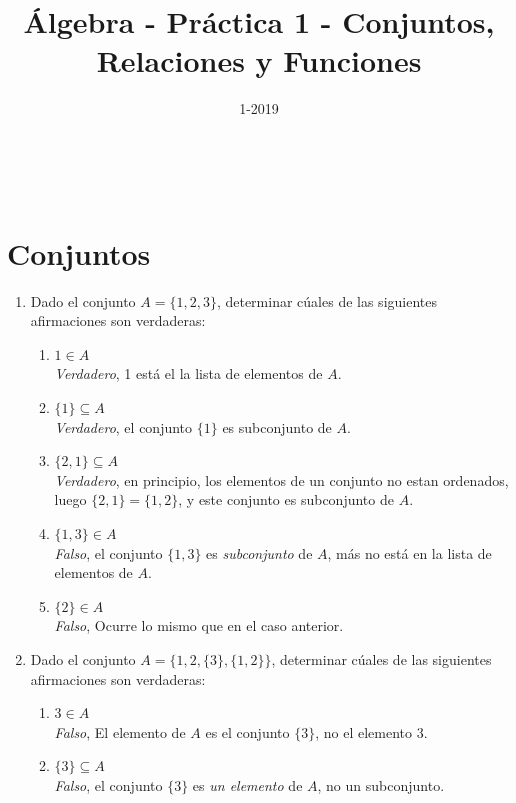 \documentclass[a4paper,11pt]{article}
\title{Álgebra - Pr\'actica 1 - Conjuntos, Relaciones y Funciones}
\author{}
\date{1-2019}
\makeatletter
\renewcommand{\maketitle}{
\begin{center}
\begin{normalsize}\textbf{\@title}\end{normalsize}\\
\begin{normalsize}\@author\end{normalsize}
\end{center}
}
\makeatother
\begin{document}
\maketitle
\section*{Conjuntos}
    \begin{enumerate}
        \item Dado el conjunto $A=\{1,2,3\}$, determinar c\'uales de las siguientes afirmaciones son verdaderas:
        \begin{enumerate}[label = \roman*)]
            \item $1\in A$\\
                \colorbox{g}{\textit{Verdadero}}, 1 est\'a el la lista de elementos de $A$.
            \item $\{1\}\subseteq A$\\
                \colorbox{g}{\textit{Verdadero}}, el conjunto $\{1\}$ es subconjunto de $A$.
            \item $\{2,1\}\subseteq A$\\
                \colorbox{g}{\textit{Verdadero}}, en principio, los elementos de un conjunto no estan ordenados, luego $\{2,1\}=\{1,2\}$, y este conjunto es subconjunto de $A$.
            \item $\{1,3\}\in A$\\
                \colorbox{g}{\textit{Falso}}, el conjunto $\{1,3\}$ es \textit{subconjunto} de $A$, m\'as no est\'a en la lista de elementos de $A$.
            \item $\{2\}\in A$\\
                \colorbox{g}{\textit{Falso}}, Ocurre lo mismo que en el caso anterior.
        \end{enumerate}
        \item Dado el conjunto $A = \{1,2,\{3\},\{1,2\}\} $, determinar c\'uales de las siguientes afirmaciones son verdaderas:
        \begin{enumerate}[label = \roman*)]
            \item $3\in A$\\
                \colorbox{g}{\textit{Falso}}, El elemento de $A$ es el conjunto $\{3\}$, no el elemento $3$.
            \item $\{3\} \subseteq A$\\
                \colorbox{g}{\textit{Falso}}, el conjunto $\{3\}$ es \textit{un elemento} de $A$, no un subconjunto.

\end{enumerate}
\end{enumerate}
\end{document}
